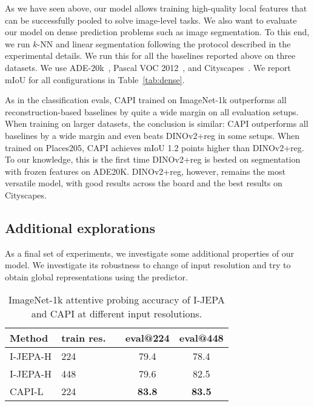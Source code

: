As we have seen above, our model allows training high-quality local features that can be successfully pooled to solve image-level tasks.
We also want to evaluate our model on dense prediction problems such as image segmentation.
To this end, we run $k$-NN and linear segmentation following the protocol described in the experimental details.
We run this for all the baselines reported above on three datasets.
We use ADE-20k~\citep{zhou2017scene}, Pascal VOC 2012~\citep{everingham2010pascal}, and Cityscapes~\citep{cordts2016cityscapes}.
We report mIoU for all configurations in Table~\ref{tab:dense}.

As in the classification evals, CAPI trained on ImageNet-1k outperforms all reconstruction-based baselines by quite a wide margin on all evaluation setups.
When training on larger datasets, the conclusion is similar: CAPI outperforms all baselines by a wide margin and even beats DINOv2+reg in some setups.
When trained on Places205, CAPI achieves mIoU 1.2 points higher than DINOv2+reg.
To our knowledge, this is the first time DINOv2+reg is bested on segmentation with frozen features on ADE20K.
DINOv2+reg, however, remains the most versatile model, with good results across the board and the best results on Cityscapes.

\subsection{Additional explorations}
\label{sec:finalexp}
As a final set of experiments, we investigate some additional properties of our model.
We investigate its robustness to change of input resolution and try to obtain global representations using the predictor.



\begin{table}[b]
    \centering
    \begin{tabular}{ll c cc}
      \toprule
      Method  & train res. && eval@224 & eval@448 \\
      \midrule
      I-JEPA-H  & 224 && 79.4 & 78.4 \\
      I-JEPA-H  & 448 && 79.6 & 82.5  \\
      CAPI-L    & 224 && \bfseries 83.8 & \bfseries 83.5 \\
      \bottomrule
    \end{tabular}
    \caption{
    ImageNet-1k attentive probing accuracy of I-JEPA and CAPI at different input resolutions.
    }
    \label{tab:high_res}
\end{table}

